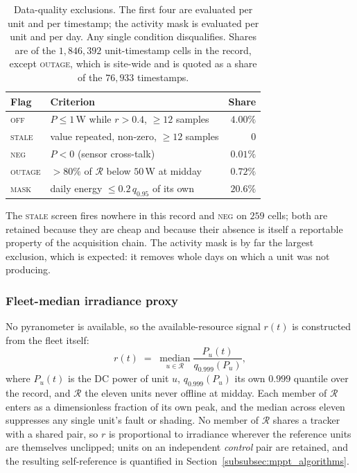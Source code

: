 \begin{table}[!t]
  \renewcommand{\arraystretch}{1.3}
  \centering
  \caption{Data-quality exclusions. The first four are evaluated per unit and
per timestamp; the activity mask is evaluated per unit and per day. Any single condition disqualifies. Shares are of the $1{,}846{,}392$ unit-timestamp cells in the record, except \textsc{outage}, which is site-wide and is quoted as a share of the $76{,}933$ timestamps.}
  \label{tab:mppt_dq}
  \footnotesize
  \setlength{\tabcolsep}{4pt}
  \begin{tabular}{@{}llr@{}}
    \toprule
    Flag & Criterion & Share \\
    \midrule
    \textsc{off}     & $P \le 1$\,W while $r > 0.4$, $\ge 12$ samples & $4.00\%$ \\
    \textsc{stale}   & value repeated, non-zero, $\ge 12$ samples & $0$ \\
    \textsc{neg}     & $P < 0$ (sensor cross-talk) & $0.01\%$ \\
    \textsc{outage}  & ${>}80\%$ of $\mathcal{R}$ below $50$\,W at midday & $0.72\%$ \\
    \textsc{mask}    & daily energy $\le 0.2\,q_{0.95}$ of its own & $20.6\%$ \\
    \bottomrule
  \end{tabular}
\end{table}

The \textsc{stale} screen fires nowhere in this record and \textsc{neg} on $259$ cells; both are retained because they are cheap and because their absence is itself a reportable property of the acquisition chain. The activity mask is by far the largest exclusion, which is expected: it removes whole days on which a unit was not producing.

\subsubsection{Fleet-median irradiance proxy}
\label{sss:mppt_ref}

No pyranometer is available, so the available-resource signal $r(t)$ is constructed from the fleet itself:
%
\begin{equation}
r(t) \;=\; \operatorname*{median}_{u \in \mathcal{R}} \frac{P_u(t)}{q_{0.999}\!\left(P_u\right)},
  \label{eq:mppt_ref}
\end{equation}
%
where $P_u(t)$ is the DC power of unit $u$, $q_{0.999}(P_u)$ its own $0.999$ quantile over the record, and $\mathcal{R}$ the eleven units never offline at midday. Each member of $\mathcal{R}$ enters as a dimensionless fraction of its own peak, and the median across eleven suppresses any single unit's fault or shading. No member of $\mathcal{R}$ shares a tracker with a shared pair, so $r$ is proportional to irradiance wherever the reference units are themselves unclipped; units on an independent \emph{control} pair are retained, and the resulting self-reference is quantified in Section~\ref{subsubsec:mppt_algorithms}.

